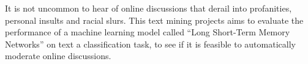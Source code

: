 It is not uncommon to hear of online discussions that derail into
profanities, personal insults and racial slurs. This text mining
projects aims to evaluate the performance of a machine learning
model called ``Long Short-Term Memory Networks'' on text a classification
task, to see if it is feasible to automatically moderate online discussions.